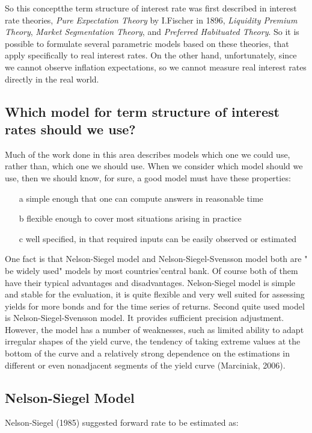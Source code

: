 \documentclass{article}
\begin{document}
\begin{spacing}{1.5}
  So this concept\textemdash the term structure of interest rate was first described in interest rate theories, \textit{Pure Expectation Theory}  by  I.Fischer in 1896, \textit{Liquidity Premium Theory}, \textit{Market Segmentation Theory}, and \textit{Preferred Habituated Theory}. So it is possible to formulate several parametric models based on these theories, that apply specifically to real interest rates. On the other hand, unfortunately, since we cannot observe inflation expectations, so we cannot measure real interest rates directly in the real world.

\subsection{Which model for term structure of interest rates should we use?}
Much of the work done in this area describes models which one we could use, rather than, which one we should use. When we consider which model should we use, then we should know, for sure, a good model must have these properties:
\begin{itemize}
\item[a] simple enough that one can compute answers in reasonable time
\item[b] flexible enough to cover most situations arising in practice
\item[c] well specified, in that required inputs can be easily observed or estimated
\end{itemize}

One fact is that Nelson-Siegel model and Nelson-Siegel-Svensson model both are " be widely used" models by most countries'central bank. Of course both of them have their typical advantages and disadvantages. Nelson-Siegel model is simple and stable for the evaluation, it is quite flexible and very well suited for assessing yields for more bonds and for the time series of returns. Second quite used model is Nelson-Siegel-Svensson model. It provides sufficient  precision adjustment. However, the model has a number of weaknesses, such as limited ability to adapt irregular shapes of the yield curve, the tendency of taking extreme values at the bottom of the curve and a relatively strong dependence on the estimations in different or even nonadjacent segments of the yield curve (Marciniak, 2006).

\subsection{Nelson-Siegel Model}
Nelson-Siegel (1985) suggested forward rate to be estimated as:
\\


\end{spacing}
\end{document}
